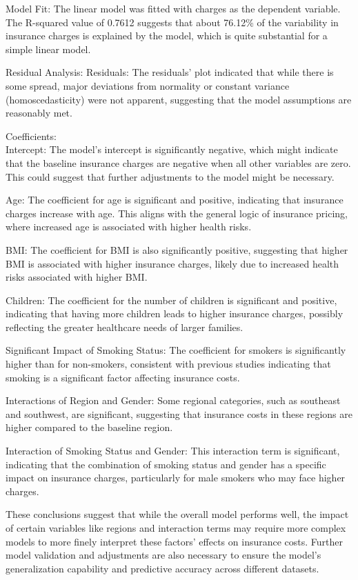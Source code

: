 \documentclass[
  12pt,
]{article}
\begin{document}
Model Fit: The linear model was fitted with charges as the dependent
variable. The R-squared value of 0.7612 suggests that about 76.12\% of
the variability in insurance charges is explained by the model, which is
quite substantial for a simple linear model.

Residual Analysis: Residuals: The residuals' plot indicated that while
there is some spread, major deviations from normality or constant
variance (homoscedasticity) were not apparent, suggesting that the model
assumptions are reasonably met.

Coefficients:\\
Intercept: The model's intercept is significantly negative, which might
indicate that the baseline insurance charges are negative when all other
variables are zero. This could suggest that further adjustments to the
model might be necessary.

Age: The coefficient for age is significant and positive, indicating
that insurance charges increase with age. This aligns with the general
logic of insurance pricing, where increased age is associated with
higher health risks.

BMI: The coefficient for BMI is also significantly positive, suggesting
that higher BMI is associated with higher insurance charges, likely due
to increased health risks associated with higher BMI.

Children: The coefficient for the number of children is significant and
positive, indicating that having more children leads to higher insurance
charges, possibly reflecting the greater healthcare needs of larger
families.

Significant Impact of Smoking Status: The coefficient for smokers is
significantly higher than for non-smokers, consistent with previous
studies indicating that smoking is a significant factor affecting
insurance costs.

Interactions of Region and Gender: Some regional categories, such as
southeast and southwest, are significant, suggesting that insurance
costs in these regions are higher compared to the baseline region.

Interaction of Smoking Status and Gender: This interaction term is
significant, indicating that the combination of smoking status and
gender has a specific impact on insurance charges, particularly for male
smokers who may face higher charges.

These conclusions suggest that while the overall model performs well,
the impact of certain variables like regions and interaction terms may
require more complex models to more finely interpret these factors'
effects on insurance costs. Further model validation and adjustments are
also necessary to ensure the model's generalization capability and
predictive accuracy across different datasets.
\end{document}
